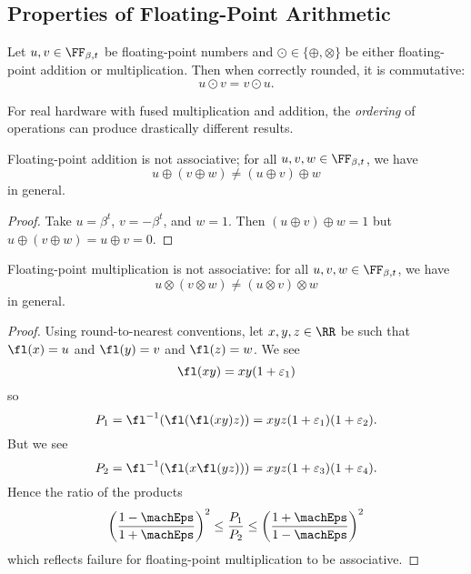 \subsection{Properties of Floating-Point Arithmetic}
\begin{thm}
  Let $u,v\in\FF_{\beta,t}$ be floating-point numbers and
  $\odot\in\{\oplus,\otimes\}$ be either floating-point addition or
  multiplication. Then when correctly rounded, it is commutative:
  \begin{equation}
    u\odot v = v\odot u.
  \end{equation}
\end{thm}

\begin{rmk}
For real hardware with fused multiplication and addition, the
\emph{ordering} of operations can produce drastically different results.
\end{rmk}

\begin{thm}
  Floating-point addition is not associative;
  for all $u,v,w\in\FF_{\beta,t}$, we have
  $$u\oplus(v\oplus w) \neq (u\oplus v)\oplus w$$
  in general.
\end{thm}
\begin{proof}
  Take $u=\beta^{t}$, $v=-\beta^{t}$, and $w=1$. Then $(u\oplus v)\oplus w=1$
  but $u\oplus(v\oplus w)=u\oplus v=0$.
\end{proof}

\begin{thm}
  Floating-point multiplication is not associative:
  for all $u,v,w\in\FF_{\beta,t}$, we have
  $$u\otimes(v\otimes w) \neq (u\otimes v)\otimes w$$
  in general.
\end{thm}
\begin{proof}
  Using round-to-nearest conventions, let $x,y,z\in\RR$ be such that
  $\fl(x)=u$ and $\fl(y)=v$ and $\fl(z)=w$. We see
  \begin{equation}
    \fl(xy) = xy(1 + \varepsilon_{1})
  \end{equation}
  so
  \begin{equation}
    P_{1}=\fl^{-1}(\fl(\fl(xy)z)) = xyz(1+\varepsilon_{1})(1 + \varepsilon_{2}).
  \end{equation}
  But we see
  \begin{equation}
    P_{2}=\fl^{-1}(\fl(x\fl(yz))) = xyz(1+\varepsilon_{3})(1 + \varepsilon_{4}).
  \end{equation}
  Hence the ratio of the products
  \begin{equation}
    \left(\frac{1 - \machEps}{1 + \machEps}\right)^{2}\leq\frac{P_{1}}{P_{2}}\leq\left(\frac{1 + \machEps}{1 - \machEps}\right)^{2}
  \end{equation}
  which reflects failure for floating-point multiplication to be associative.
\end{proof}
